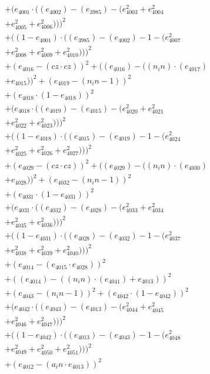 \documentclass[10pt, a4paper]{article}
\begin{document}
\begin{align*}
& + (e_{4001}  \cdot  ((e_{4002}) - (e_{3985}) - (e_{4003}^{2} + e_{4004}^{2} \\
& + e_{4005}^{2} + e_{4006}^{2})))^{2} \\
& + ((1 - e_{4001})  \cdot  ((e_{3985}) - (e_{4002}) - 1 - (e_{4007}^{2} \\
& + e_{4008}^{2} + e_{4009}^{2} + e_{4010}^{2})))^{2} \\
& + (e_{4016} - (cz  \cdot  cz))^{2} + ((e_{4016}) - ((n_in)  \cdot  (e_{4017}) \\
& + e_{4015}))^{2} + (e_{4019} - (n_in - 1))^{2} \\
& + (e_{4018}  \cdot  (1 - e_{4018}))^{2} \\
& + (e_{4018}  \cdot  ((e_{4019}) - (e_{4015}) - (e_{4020}^{2} + e_{4021}^{2} \\
& + e_{4022}^{2} + e_{4023}^{2})))^{2} \\
& + ((1 - e_{4018})  \cdot  ((e_{4015}) - (e_{4019}) - 1 - (e_{4024}^{2} \\
& + e_{4025}^{2} + e_{4026}^{2} + e_{4027}^{2})))^{2} \\
& + (e_{4029} - (cz  \cdot  cz))^{2} + ((e_{4029}) - ((n_in)  \cdot  (e_{4030}) \\
& + e_{4028}))^{2} + (e_{4032} - (n_in - 1))^{2} \\
& + (e_{4031}  \cdot  (1 - e_{4031}))^{2} \\
& + (e_{4031}  \cdot  ((e_{4032}) - (e_{4028}) - (e_{4033}^{2} + e_{4034}^{2} \\
& + e_{4035}^{2} + e_{4036}^{2})))^{2} \\
& + ((1 - e_{4031})  \cdot  ((e_{4028}) - (e_{4032}) - 1 - (e_{4037}^{2} \\
& + e_{4038}^{2} + e_{4039}^{2} + e_{4040}^{2})))^{2} \\
& + (e_{4014} - (e_{4015}  \cdot  e_{4028}))^{2} \\
& + ((e_{4014}) - ((n_in)  \cdot  (e_{4041}) + e_{4013}))^{2} \\
& + (e_{4043} - (n_in - 1))^{2} + (e_{4042}  \cdot  (1 - e_{4042}))^{2} \\
& + (e_{4042}  \cdot  ((e_{4043}) - (e_{4013}) - (e_{4044}^{2} + e_{4045}^{2} \\
& + e_{4046}^{2} + e_{4047}^{2})))^{2} \\
& + ((1 - e_{4042})  \cdot  ((e_{4013}) - (e_{4043}) - 1 - (e_{4048}^{2} \\
& + e_{4049}^{2} + e_{4050}^{2} + e_{4051}^{2})))^{2} \\
& + (e_{4012} - (a_in  \cdot  e_{4013}))^{2} \\

\end{align*}
\end{document}
